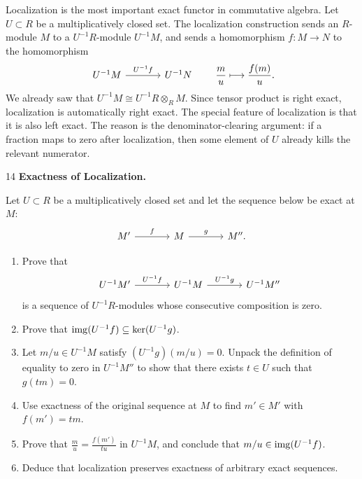 \documentclass[Notebook.tex]{subfiles}
\begin{document}
\newpage 

\hrulefill

Localization is the most important exact functor in commutative algebra. Let $U\subset R$ be a multiplicatively closed set. The localization construction sends an $R$-module $M$ to a $U^{-1}R$-module $U^{-1}M$, and sends a homomorphism $f:M\to N$ to the homomorphism
\[
\begin{tikzcd}[column sep=large]
U^{-1}M \arrow[r, "U^{-1}f"] & U^{-1}N
\end{tikzcd}
\qquad
\frac{m}{u}\longmapsto \frac{f(m)}{u}.
\]
We already saw that $U^{-1}M\cong U^{-1}R\otimes_R M$. Since tensor product is right exact, localization is automatically right exact. The special feature of localization is that it is also left exact. The reason is the denominator-clearing argument: if a fraction maps to zero after localization, then some element of $U$ already kills the relevant numerator.

\hrulefill

\newpage

\begin{problem}{14}
    \textbf{Exactness of Localization.} 
    
    Let $U\subset R$ be a multiplicatively closed set and let the sequence below be exact at $M$:
    \[
    \begin{tikzcd}[column sep=large]
    M' \arrow[r, "f"] & M \arrow[r, "g"] & M''.
    \end{tikzcd}
    \]
    \begin{enumerate}
    \item Prove that
    \[
    \begin{tikzcd}[column sep=large]
    U^{-1}M' \arrow[r, "U^{-1}f"] & U^{-1}M \arrow[r, "U^{-1}g"] & U^{-1}M''
    \end{tikzcd}
    \]
    is a sequence of $U^{-1}R$-modules whose consecutive composition is zero.
    \item Prove that $\operatorname{img}(U^{-1}f)\subseteq \ker(U^{-1}g)$.
    \item Let $m/u\in U^{-1}M$ satisfy $(U^{-1}g)(m/u)=0$. Unpack the definition of equality to zero in $U^{-1}M''$ to show that there exists $t\in U$ such that $g(tm)=0$.
    \item Use exactness of the original sequence at $M$ to find $m'\in M'$ with $f(m')=tm$.
    \item Prove that $\frac{m}{u}=\frac{f(m')}{tu}$ in $U^{-1}M$, and conclude that $m/u\in \operatorname{img}(U^{-1}f)$.
    \item Deduce that localization preserves exactness of arbitrary exact sequences. 
    \end{enumerate}
\end{problem}
\end{document}
